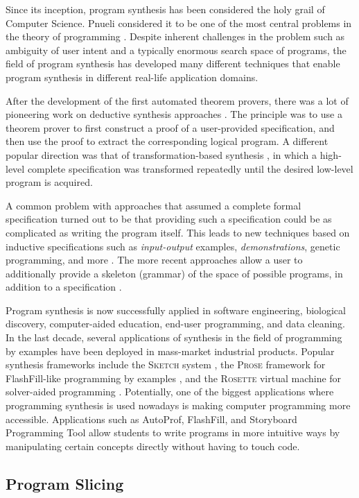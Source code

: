 Since its inception, program synthesis has been considered the holy grail of Computer Science. Pnueli considered it to be one of the most central problems in the theory of programming \todo{}. Despite inherent challenges in the problem such as ambiguity of user intent and a typically enormous search space of programs, the ﬁeld of program synthesis has developed many diﬀerent techniques that enable program synthesis in diﬀerent real-life application domains.

After the development of the first automated theorem provers, there was a lot of pioneering work on deductive synthesis approaches \todo{}. The principle was to use a theorem prover to first construct a proof of a user-provided specification, and then use the proof to extract the corresponding logical program. A different popular direction was that of transformation-based synthesis \todo{}, in which a high-level complete specification was transformed repeatedly until the desired low-level program is acquired.

A common problem with approaches that assumed a complete formal specification turned out to be that providing such a specification could be as complicated as writing the program itself. This leads to new techniques based on inductive specifications such as \emph{input-output} examples, \emph{demonstrations}, genetic programming, and more \todo{}. The more recent approaches allow a user to additionally provide a skeleton (grammar) of the space of possible programs, in addition to a specification \todo{}.

Program synthesis is now successfully applied in software engineering, biological discovery, computer-aided education, end-user programming, and data cleaning. In the last decade, several applications of synthesis in the ﬁeld of programming by examples have been deployed in mass-market industrial products. Popular synthesis frameworks include the \textsc{Sketch} system \todo{}, the \textsc{Prose} framework for FlashFill-like programming by examples \todo{}, and the \textsc{Rosette} virtual machine for solver-aided programming \todo{}. Potentially, one of the biggest applications where programming synthesis is used nowadays is making computer programming more accessible. Applications such as AutoProf, FlashFill, and Storyboard Programming Tool allow students to write programs in more intuitive ways by manipulating certain concepts directly without having to touch code.


\subsection{Program Slicing}

